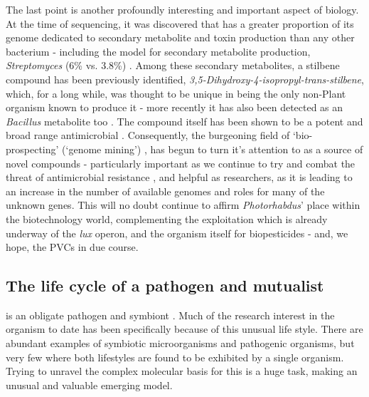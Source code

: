The last point is another profoundly interesting and important aspect of \Pa{} biology. At the time of sequencing, it was discovered that \Pa{} has a greater proportion of its genome dedicated to secondary metabolite and toxin production than any other bacterium - including the model for secondary metabolite production, \emph{Streptomyces} (6\% vs. 3.8\%) \citep{Waterfield2009,Duchaud2003}. Among these secondary metabolites, a stilbene compound has been previously identified, \emph{3,5-Dihydroxy-4-isopropyl-trans-stilbene}, which, for a long while, \Pa{} was thought to be unique in being the only non-Plant organism known to produce it \citep{Joyce2008} - more recently it has also been detected as an \emph{Bacillus} metabolite too \citep{Kumar2013}. The compound itself has been shown to be a potent and broad range antimicrobial \citep{Hu2000}.
Consequently, the burgeoning field of `bio-prospecting' (`genome mining') \citep{Shi2018}, has begun to turn it's attention to \Pa{} as a source of novel compounds - particularly important as we continue to try and combat the threat of antimicrobial resistance \citep{Orozco2016}, and helpful as \Pa{} researchers, as it is leading to an increase in the number of available genomes and roles for many of the unknown genes. This will no doubt continue to affirm \emph{Photorhabdus}' place within the biotechnology world, complementing the exploitation which is already underway of the \emph{lux} operon, and the organism itself for biopesticides - and, we hope, the PVCs in due course.

\subsection{The life cycle of a pathogen and mutualist}\label{lifecycle}
\Pa{} is an obligate pathogen and symbiont \citep{Ffrench-Constant2003}. Much of the research interest in the organism to date has been specifically because of this unusual life style. There are abundant examples of symbiotic microorganisms and pathogenic organisms, but very few where both lifestyles are found to be exhibited by a single organism. Trying to unravel the complex molecular basis for this is a huge task, making \Pa{} an unusual and valuable emerging model.

